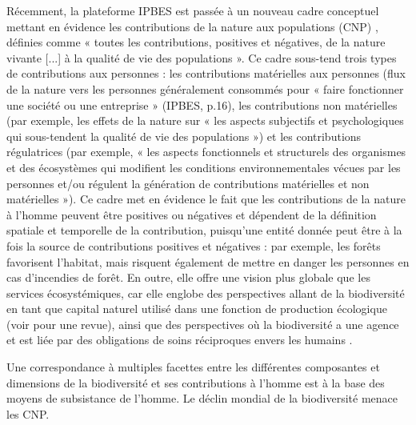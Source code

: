 \begin{displayquote}
\begin{displayquote}
\begin{displayquote}
Récemment, la plateforme IPBES est passée à un nouveau cadre conceptuel mettant en évidence les contributions de la nature aux populations (CNP) \citep{DIAZ20151}, définies comme « toutes les contributions, positives et négatives, de la nature vivante [...] à la qualité de vie des populations \citep{diaz_2018} ». Ce cadre sous-tend trois types de contributions aux personnes : les contributions matérielles aux personnes (flux de la nature vers les personnes généralement consommés pour « faire fonctionner une société ou une entreprise » (IPBES, p.16), les contributions non matérielles (par exemple, les effets de la nature sur « les aspects subjectifs et psychologiques qui sous-tendent la qualité de vie des populations ») et les contributions régulatrices (par exemple, « les aspects fonctionnels et structurels des organismes et des écosystèmes qui modifient les conditions environnementales vécues par les personnes et/ou régulent la génération de contributions matérielles et non matérielles »). Ce cadre met en évidence le fait que les contributions de la nature à l'homme peuvent être positives ou négatives et dépendent de la définition spatiale et temporelle de la contribution, puisqu'une entité donnée peut être à la fois la source de contributions positives et négatives : par exemple, les forêts favorisent l'habitat, mais risquent également de mettre en danger les personnes en cas d'incendies de forêt. En outre, elle offre une vision plus globale que les services écosystémiques, car elle englobe des perspectives allant de la biodiversité en tant que capital naturel utilisé dans une fonction de production écologique (voir \cite{polasky_integrating_2009} pour une revue), ainsi que des perspectives où la biodiversité a une agence et est liée par des obligations de soins réciproques envers les humains \citep{descola}. 

Une correspondance à multiples facettes entre les différentes composantes et dimensions de la biodiversité et ses contributions à l'homme est à la base des moyens de subsistance de l'homme. Le déclin mondial de la biodiversité menace les CNP.

\clearpage
\begin{tcolorbox}[breakable, 
colback=verylightgray, 
colframe=gray!75!black, 
title= {Box 1 - Soutenabilité Faible et Forte},
fontupper=\small]
\par %
\justifying %


\end{tcolorbox}
\end{displayquote}
\end{displayquote}
\end{displayquote}
